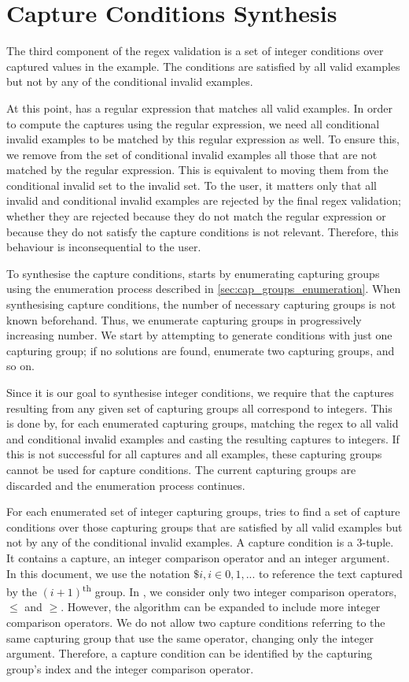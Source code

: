 \section{Capture Conditions Synthesis}
The third component of the regex validation is a set of integer conditions over captured values in the example. The conditions are satisfied by all valid examples but not by any of the conditional invalid examples.

At this point, \Forest has a regular expression that matches all valid examples.
In order to compute the captures using the regular expression, we need all conditional invalid examples to be matched by this regular expression as well.
To ensure this, we remove from the set of conditional invalid examples all those that are not matched by the regular expression. 
This is equivalent to moving them from the conditional invalid set to the invalid set.
To the user, it matters only that all invalid and conditional invalid examples are rejected by the final regex validation; whether they are rejected because they do not match the regular expression or because they do not satisfy the capture conditions is not relevant. Therefore, this behaviour is inconsequential to the user.

To synthesise the capture conditions, \Forest starts by enumerating capturing groups using the enumeration process described in \autoref{sec:cap_groups_enumeration}. When synthesising capture conditions, the number of necessary capturing groups is not known beforehand. Thus, we enumerate capturing groups in progressively increasing number. We start by attempting to generate conditions with just one capturing group; if no solutions are found, enumerate two capturing groups, and so on.

Since it is our goal to synthesise integer conditions, we require that the captures resulting from any given set of capturing groups all correspond to integers. This is done by, for each enumerated capturing groups, matching the regex to all valid and conditional invalid examples and casting the resulting captures to integers. If this is not successful for all captures and all examples, these capturing groups cannot be used for capture conditions. The current capturing groups are discarded and the enumeration process continues.


For each enumerated set of integer capturing groups, \Forest tries to find a set of capture conditions over those capturing groups that are satisfied by all valid examples but not by any of the conditional invalid examples.
%
A capture condition is a 3-tuple. It contains a capture, an integer comparison operator and an integer argument. In this document, we use the notation \(\$i, i \in 0, 1, ...\) to reference the text captured by the \((i+1)\)\textsuperscript{th} group. In \Forest, we consider only two integer comparison operators, $\le$ and $\ge$. However, the algorithm can be expanded to include more integer comparison operators. We do not allow two capture conditions referring to the same capturing group that use the same operator, changing only the integer argument. Therefore, a capture condition can be identified by the capturing group's index and the integer comparison operator.

